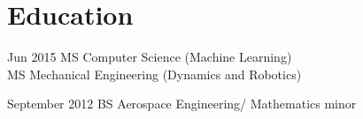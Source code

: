 \documentclass[letterpaper]{simjega-resume}
\begin{document}




\section{Education}
\jgsectionline

{Jun 2015}
{MS Computer Science (Machine Learning) \\
MS Mechanical Engineering (Dynamics and Robotics)}

{September 2012}
{BS Aerospace Engineering/ Mathematics minor}


\end{document}
